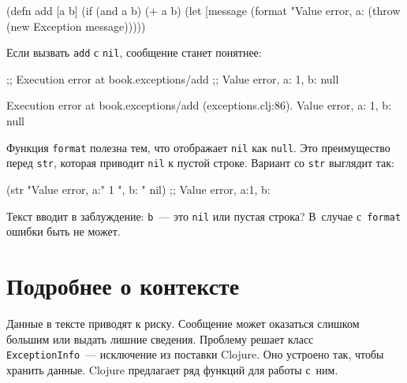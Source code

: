\begin{english}
  \begin{clojure}
(defn add [a b]
  (if (and a b)
    (+ a b)
    (let [message (format "Value error, a: %
      (throw (new Exception message)))))
  \end{clojure}
\end{english}

\fi

\noindent
Если вызвать \verb|add| с \verb|nil|, сообщение станет понятнее:

\ifx\DEVICETYPE\MOBILE

\begin{english}
  \begin{clojure}
;; Execution error at book.exceptions/add
;; Value error, a: 1, b: null
  \end{clojure}
\end{english}

\else

\begin{english}
  \begin{clojure}
Execution error at book.exceptions/add (exceptions.clj:86).
Value error, a: 1, b: null
  \end{clojure}
\end{english}

\fi

Функция \verb|format| полезна тем, что отображает \verb|nil| как
\verb|null|. Это преимущество перед \verb|str|, которая приводит
\verb|nil| к пустой строке. Вариант со \verb|str| выглядит так:

\begin{english}
  \begin{clojure}
(str "Value error, a:" 1 ", b: " nil)
;; Value error, a:1, b:
  \end{clojure}
\end{english}

\noindent
Текст вводит в заблуждение: \verb|b|~--- это \verb|nil| или пустая строка? В~случае
с~\verb|format| ошибки быть не может.

\section{Подробнее о контексте}


Данные в тексте приводят к риску. Сообщение может оказаться слишком большим или
выдать лишние сведения. Проблему решает класс \verb|ExceptionInfo|~---
исключение из поставки Clojure. Оно устроено так, чтобы хранить данные. Clojure
предлагает ряд функций для работы с~ним.

